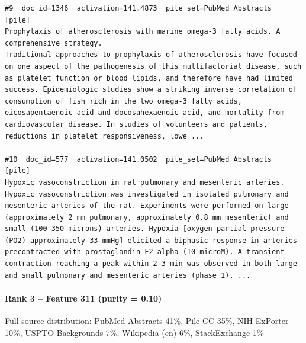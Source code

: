 \begin{verbatim}
#9  doc_id=1346  activation=141.4873  pile_set=PubMed Abstracts  [pile]
Prophylaxis of atherosclerosis with marine omega-3 fatty acids. A comprehensive strategy.
Traditional approaches to prophylaxis of atherosclerosis have focused on one aspect of the pathogenesis of this multifactorial disease, such as platelet function or blood lipids, and therefore have had limited success. Epidemiologic studies show a striking inverse correlation of consumption of fish rich in the two omega-3 fatty acids, eicosapentaenoic acid and docosahexaenoic acid, and mortality from cardiovascular disease. In studies of volunteers and patients, reductions in platelet responsiveness, lowe ...

#10  doc_id=577  activation=141.0502  pile_set=PubMed Abstracts  [pile]
Hypoxic vasoconstriction in rat pulmonary and mesenteric arteries.
Hypoxic vasoconstriction was investigated in isolated pulmonary and mesenteric arteries of the rat. Experiments were performed on large (approximately 2 mm pulmonary, approximately 0.8 mm mesenteric) and small (100-350 microns) arteries. Hypoxia [oxygen partial pressure (PO2) approximately 33 mmHg] elicited a biphasic response in arteries precontracted with prostaglandin F2 alpha (10 microM). A transient contraction reaching a peak within 2-3 min was observed in both large and small pulmonary and mesenteric arteries (phase 1). ...

\end{verbatim}

\paragraph*{Rank 3 -- Feature 311 (purity = 0.10)}

Full source distribution: PubMed Abstracts 41\%, Pile-CC 35\%, NIH ExPorter 10\%, USPTO Backgrounds 7\%, Wikipedia (en) 6\%, StackExchange 1\%

